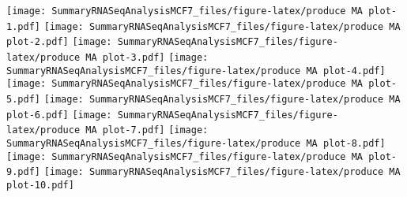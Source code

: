 \documentclass[]{article}
\begin{document}
\texttt{[image: SummaryRNASeqAnalysisMCF7\_files/figure-latex/produce MA plot-1.pdf]}
\texttt{[image: SummaryRNASeqAnalysisMCF7\_files/figure-latex/produce MA plot-2.pdf]}
\texttt{[image: SummaryRNASeqAnalysisMCF7\_files/figure-latex/produce MA plot-3.pdf]}
\texttt{[image: SummaryRNASeqAnalysisMCF7\_files/figure-latex/produce MA plot-4.pdf]}
\texttt{[image: SummaryRNASeqAnalysisMCF7\_files/figure-latex/produce MA plot-5.pdf]}
\texttt{[image: SummaryRNASeqAnalysisMCF7\_files/figure-latex/produce MA plot-6.pdf]}
\texttt{[image: SummaryRNASeqAnalysisMCF7\_files/figure-latex/produce MA plot-7.pdf]}
\texttt{[image: SummaryRNASeqAnalysisMCF7\_files/figure-latex/produce MA plot-8.pdf]}
\texttt{[image: SummaryRNASeqAnalysisMCF7\_files/figure-latex/produce MA plot-9.pdf]}
\texttt{[image: SummaryRNASeqAnalysisMCF7\_files/figure-latex/produce MA plot-10.pdf]}
\end{document}
